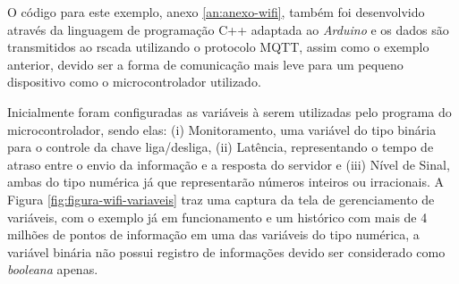 O código para este exemplo, anexo \ref{an:anexo-wifi}, também foi desenvolvido através da linguagem de programação C++ adaptada ao \textit{Arduino} e os dados são transmitidos ao rscada utilizando o protocolo \gls{MQTT}, assim como o exemplo anterior, devido ser a forma de comunicação mais leve para um pequeno dispositivo como o microcontrolador utilizado.

        \begin{figure}[!h]
    	\end{figure}
    	
Inicialmente foram configuradas as variáveis à serem utilizadas pelo programa do microcontrolador, sendo elas: (i) Monitoramento, uma variável do tipo binária para o controle da chave liga/desliga, (ii)  Latência, representando o tempo de atraso entre o envio da informação e a resposta do servidor e (iii) Nível de Sinal, ambas do tipo numérica já que representarão números inteiros ou irracionais. A Figura \ref{fig:figura-wifi-variaveis} traz uma captura da tela de gerenciamento de variáveis, com o exemplo já em funcionamento e um histórico com mais de 4 milhões de pontos de informação em uma das variáveis do tipo numérica, a variável binária não possui registro de informações devido ser considerado como  \textit{booleana} apenas.

        \begin{figure}[!h]
    	\end{figure}


